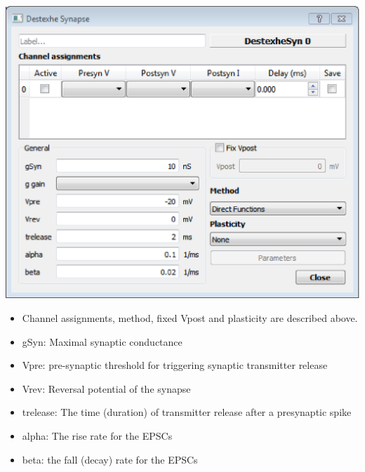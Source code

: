 \documentclass{article}
\begin{document}
\noindent
\parbox[b]{0.58\textwidth}{
\includegraphics[scale=0.5]{destexheSynDialog}}
\hfill
\parbox[b]{0.4\textwidth}{
\begin{itemize}
\item Channel assignments, method, fixed Vpost and plasticity are described above.
\item gSyn: Maximal synaptic conductance
\item Vpre: pre-synaptic threshold for triggering synaptic transmitter
  release
\item Vrev: Reversal potential of the synapse
\item trelease: The time (duration) of transmitter release after a
  presynaptic spike
\item alpha: The rise rate for the EPSCs
\item beta: the fall (decay) rate for the EPSCs
\end{itemize}
}\\
\end{document}
